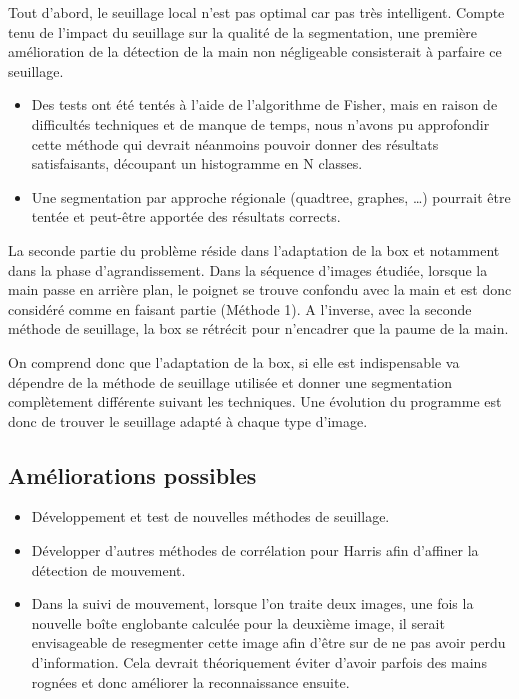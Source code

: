 Tout d’abord, le seuillage local n’est pas optimal car pas très intelligent. Compte tenu de l’impact du seuillage sur la qualité de la segmentation, une première amélioration de la détection de la main non négligeable consisterait à parfaire ce seuillage.
\begin{itemize}
\item Des tests ont été tentés à l’aide de l’algorithme de Fisher, mais en raison de difficultés techniques et de manque de temps, nous n’avons pu approfondir cette méthode qui devrait néanmoins pouvoir donner des résultats satisfaisants, découpant un histogramme en N classes.
\item Une segmentation par approche régionale (quadtree, graphes, …) pourrait être tentée et peut-être apportée des résultats corrects.
\end{itemize}

La seconde partie du problème réside dans l’adaptation de la box et notamment dans la phase d’agrandissement. Dans la séquence d’images étudiée, lorsque la main passe en arrière plan, le poignet se trouve confondu avec la main et est donc considéré comme en faisant partie (Méthode 1). A l’inverse, avec la seconde méthode de seuillage, la box se rétrécit pour n’encadrer que la paume de la main.

On comprend donc que l’adaptation de la box, si elle est indispensable va dépendre de la méthode de seuillage utilisée et donner une segmentation complètement différente suivant les techniques.
Une évolution du programme est donc de trouver le seuillage adapté à chaque type d’image.

\subsection{Améliorations possibles}
\begin{itemize}
\item Développement et test de nouvelles méthodes de seuillage.
\item Développer d’autres méthodes de corrélation pour Harris afin d’affiner la détection de mouvement.
\item Dans la suivi de mouvement, lorsque l’on traite deux images, une fois la nouvelle boîte englobante calculée pour la deuxième image, il serait envisageable de resegmenter cette image afin d’être sur de ne pas avoir perdu d’information. Cela devrait théoriquement éviter d’avoir parfois des mains rognées et donc améliorer la reconnaissance ensuite.
\end{itemize}
